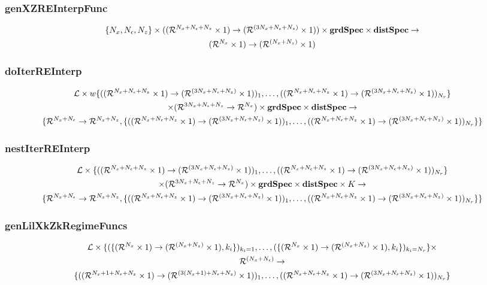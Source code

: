 \documentclass[tikz]{beamer}
\begin{document}
\begin{frame}
\frametitle{genXZREInterpFunc}
\label{sec:genfpfunc}
\begin{gather*}
\{\numX,\numEps,\numZ\}\times(\lilXFuncSig)\times \grdSpec \times  \dstSpec   \rightarrow\\
\bigXFuncSig
\end{gather*}



\end{frame}
\begin{frame}
\frametitle{doIterREInterp}
\label{sec:doiterreinterp}

\begin{gather*}
  \linMod \times 
w\{(\lilXFuncSig)_1,\ldots,(\lilXFuncSig)_{\numR}\}  \\
 \times (\eqnFuncSig ) \times \grdSpec \times \dstSpec \rightarrow\\
\{\frfpnsFuncSig, \{(\lilXFuncSig)_1,\ldots,(\lilXFuncSig)_{\numR}\}\}
\end{gather*}



\end{frame}
\begin{frame}
\frametitle{nestIterREInterp}
\label{sec:nestiterreinterp}



\begin{gather*}
  \linMod \times 
\{(\lilXFuncSig)_1,\ldots,(\lilXFuncSig)_{\numR}\}  \\
 \times (\eqnFuncSig ) \times \grdSpec \times \dstSpec \times \numIters \rightarrow\\
\{\frfpnsFuncSig, \{(\lilXFuncSig)_1,\ldots,(\lilXFuncSig)_{\numR}\}\}
\end{gather*}



\end{frame}
\begin{frame}
\frametitle{genLilXkZkRegimeFuncs}
\label{sec:genlilxkzkregimefunc}
{\small
\begin{gather*}
\linMod \times \{(\{  \bigXFuncSig, k_i \})_{k_i=1},\ldots,(\{  \bigXFuncSig, k_i \})_{k_i=\numR}\} \times\\ \Rn{(\numX+\numEps)} \rightarrow\\
\{(\lilXRegimeFuncSig)_1,\ldots,(\lilXFuncSig)_{\numR}\}
\end{gather*}
}





\end{frame}
\end{document}
